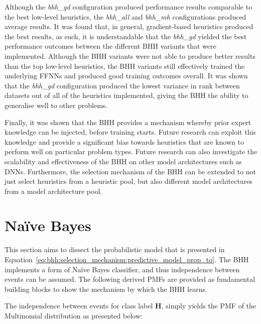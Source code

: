 \documentclass[preprint,review,12pt]{elsarticle}
\begin{document}
Although the \textit{bhh\_gd} configuration produced performance results comparable to the best low-level heuristics, the \textit{bhh\_all} and \textit{bhh\_mh} configurations produced average results. It was found that, in general, gradient-based heuristics produced the best results, as such, it is understandable that the \textit{bhh\_gd} yielded the best performance outcomes between the different \acs{BHH} variants that were implemented. Although the \acs{BHH} variants were not able to produce better results than the top low-level heuristics, the \acs{BHH} variants still effectively trained the underlying \acp{FFNN} and produced good training outcomes overall. It was shown that the \textit{bhh\_gd} configuration produced the lowest variance in rank between datasets out of all of the heuristics implemented, giving the \acs{BHH} the ability to generalise well to other problems.

Finally, it was shown that the \acs{BHH} provides a mechanism whereby prior expert knowledge can be injected, before training starts. Future research can exploit this knowledge and provide a significant bias towards heuristics that are known to perform well on particular problem types. Future research can also investigate the scalability and effectiveness of the \acs{BHH} on other model architectures such as \acfp{DNN}. Furthermore, the selection mechanism of the \acs{BHH} can be extended to not just select heuristics from a heuristic pool, but also different model architectures from a model architecture pool.

\appendix

\section{Naïve Bayes}
\label{app:naive_bayes}

This section aims to dissect the probabilistic model that is presented in Equation~\eqref{eq:bhh:selection_mechanism:predictive_model_prop_to}. The \acs{BHH} implements a form of Naïve Bayes classifier, and thus independence between events can be assumed. The following derived \acp{PMF} are provided as fundamental building blocks to show the mechanism by which the \acs{BHH} learns.

The independence between events for class label $\boldsymbol{H}$, simply yields the \ac{PMF} of the Multinomial distribution as presented below:
\end{document}
